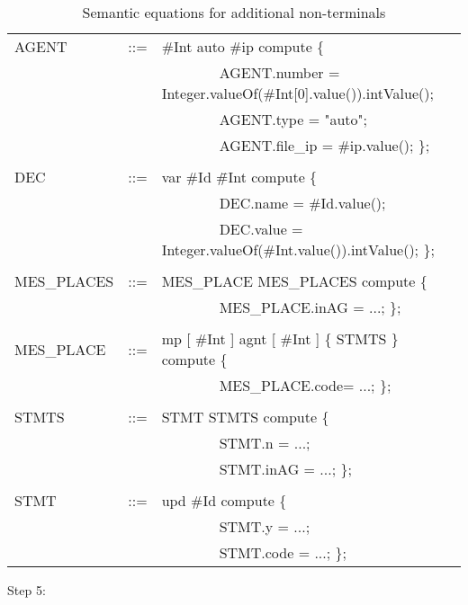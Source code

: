 \documentclass[preprint, prX]{revtex4}
\begin{document}
\begin{table}[htb]           \caption{Semantic equations for additional non-terminals}
\label{tab:tab25}
\vspace{-5mm}
\footnotesize
\begin{center}
\begin{tabular}{ | l  l  l | }
\hline
AGENT & ::= & \#Int auto \#ip \; compute \{ \\
 & &  \ \ \ \ \ \ \ \ AGENT.number = Integer.valueOf(\#Int[0].value()).intValue(); \\
 & &  \ \ \ \ \ \ \ \ AGENT.type = "auto"; \\
 & &  \ \ \ \ \ \ \ \ AGENT.file\_ip = \#ip.value(); \}; \\
 & & \\
DEC & ::= & var \#Id \:\=  \#Int \; compute \{ \\
 & &  \ \ \ \ \ \ \ \ DEC.name = \#Id.value(); \\
 & &  \ \ \ \ \ \ \ \ DEC.value = Integer.valueOf(\#Int.value()).intValue(); \}; \\
 & & \\
MES\_PLACES & ::= & MES\_PLACE MES\_PLACES compute \{ \\
 & &  \ \ \ \ \ \ \ \ MES\_PLACE.inAG = ...; \}; \\
 & & \\
MES\_PLACE & ::= & mp [ \#Int ]   agnt [ \#Int ] \{ STMTS \} compute \{ \\
 & &  \ \ \ \ \ \ \ \ MES\_PLACE.code= ...; \}; \\
 & & \\
STMTS & ::= & STMT STMTS compute \{ \\
 & &  \ \ \ \ \ \ \ \ STMT.n = ...; \\
 & &  \ \ \ \ \ \ \ \ STMT.inAG = ...; \}; \\
 & & \\
STMT & ::= & upd  \#Id \; compute \{ \\
 & &  \ \ \ \ \ \ \ \ STMT.y =  ...; \\
 & &  \ \ \ \ \ \ \ \ STMT.code = ...; \}; \\
\hline
\end{tabular}
\end{center}
\normalsize
\vspace{-5mm}
\end{table}


Step 5:
\end{document}
